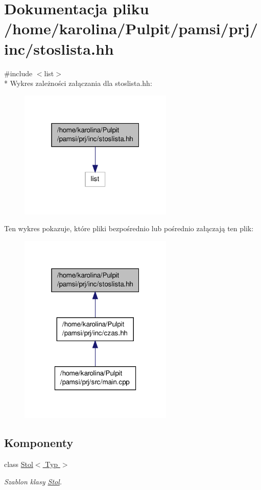 \hypertarget{stoslista_8hh}{\section{Dokumentacja pliku /home/karolina/\-Pulpit/pamsi/prj/inc/stoslista.hh}
\label{stoslista_8hh}
}
{\ttfamily \#include $<$list$>$}\\*
Wykres zależności załączania dla stoslista.\-hh\-:\nopagebreak
\begin{figure}[H]
\begin{center}
\leavevmode
\includegraphics[width=208pt]{stoslista_8hh__incl}
\end{center}
\end{figure}
Ten wykres pokazuje, które pliki bezpośrednio lub pośrednio załączają ten plik\-:\nopagebreak
\begin{figure}[H]
\begin{center}
\leavevmode
\includegraphics[width=208pt]{stoslista_8hh__dep__incl}
\end{center}
\end{figure}
\subsection*{Komponenty}
\begin{DoxyCompactItemize}
\item 
class \hyperlink{class_stol}{Stol$<$ Typ $>$}
\begin{DoxyCompactList}\small\item\em Szablon klasy \hyperlink{class_stol}{Stol}. \end{DoxyCompactList}\end{DoxyCompactItemize}
